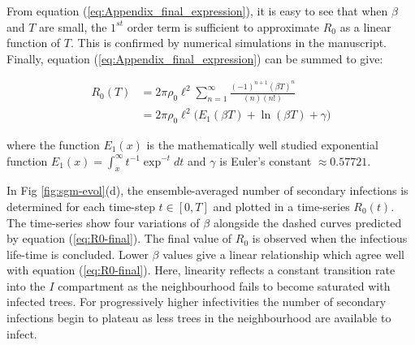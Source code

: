 From equation (\ref{eq:Appendix_final_expression}), it is easy to see that when $\beta$ and $T$ are small, the $1^{st}$ order term is sufficient to approximate $R_0$ as a linear function of $T$. This is confirmed by numerical simulations in the manuscript. Finally, equation (\ref{eq:Appendix_final_expression}) can be summed to give:

\begin{equation} \label{eq:Appendix_final_expression}
\begin{split}
R_0(T) & = 2\pi\rho_0 \ell^2 \sum^{\infty}_{n=1} \frac{(-1)^{n+1} (\beta T)^n}{(n)(n!)}\\
& =  2\pi\rho_0 \ell^2 \big(E_1(\beta T) + \ln (\beta T) + \gamma\big)
\end{split}
\end{equation}

where the function $E_1(x)$ is the mathematically well studied exponential function $E_1(x)=\int^{\infty}_x t^{-1}\exp^{-t}dt$ and $\gamma$ is Euler's constant $\approx 0.57721$.


In Fig \ref{fig:sgm-evol}(d), the ensemble-averaged number of secondary infections is determined for each time-step $t\in [0, T]$ and plotted in a time-series $R_0(t)$. The time-series show four variations of $\beta$ alongside the dashed curves predicted by equation (\ref{eq:R0-final}). The final value of $R_0$ is observed when the infectious life-time is concluded. Lower $\beta$ values give a linear relationship which agree well with equation (\ref{eq:R0-final}). Here, linearity reflects a constant transition rate into the $I$ compartment as the neighbourhood fails to become saturated with infected trees. For progressively higher infectivities the number of secondary infections begin to plateau as less trees in the neighbourhood are available to infect.\\

